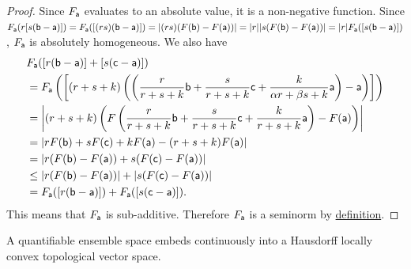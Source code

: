 \begin{proof}
	Since $F_{\ens[a]}$ evaluates to an absolute value, it is a non-negative function. Since $F_{\ens[a]}(r[s(\ens[b]-\ens[a])]) = F_{\ens[a]}([(rs)(\ens[b]-\ens[a])]) = |(rs) (F(\ens[b]) - F(\ens[a]))| = |r| |s (F(\ens[b]) - F(\ens[a]))| = |r| F_{\ens[a]}([s(\ens[b]-\ens[a])])$, $F_{\ens[a]}$ is absolutely homogeneous. We also have
	\begin{equation}
	\begin{aligned}
		&F_{\ens[a]}([r(\ens[b]-\ens[a])] + [s(\ens[c]-\ens[a])])  \\
		&= F_{\ens[a]}\left(\left[(r+s+k) \left(\left(\frac{r}{r+s+k}\ens[b] + \frac{s}{r+s+k} \ens[c] +\frac{k}{\alpha r+ \beta s+k} \ens[a] \right) - \ens[a]\right)\right]\right) \\
		&= \left|(r+s+k)\left(F\left(\frac{r}{r+s+k}\ens[b] + \frac{s}{r+s+k} \ens[c] +\frac{k}{r+s+k} \ens[a]\right) - F(\ens[a]) \right)\right| \\
		&= \left|r F(\ens[b]) + s F(\ens[c]) + k F(\ens[a]) - (r+s+k) F(\ens[a]) \right| \\
		&= \left|r ( F(\ens[b]) - F(\ens[a]))  + s ( F(\ens[c]) - F(\ens[a])) \right| \\
		&\leq \left| r ( F(\ens[b]) - F(\ens[a])) \right| + \left| s ( F(\ens[c]) - F(\ens[a])) \right| \\
		&= F_{\ens[a]}([r(\ens[b]-\ens[a])]) + F_{\ens[a]}([s(\ens[c]-\ens[a])]).
	\end{aligned}
	\end{equation}
	This means that $F_{\ens[a]}$ is sub-additive. Therefore $F_{\ens[a]}$ is a seminorm by \href{https://en.wikipedia.org/wiki/Seminorm}{definition}.
\end{proof}

\begin{prop}
	A quantifiable ensemble space embeds continuously into a Hausdorff locally convex topological vector space.
\end{prop}

